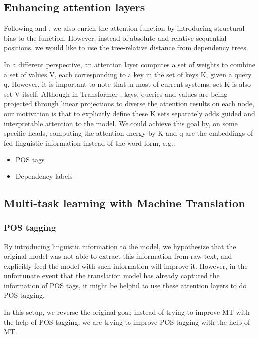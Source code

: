 \documentclass{article}
\begin{document}
\subsection{Enhancing attention layers}

Following \cite{DBLP:conf/naacl/CohnHVYDH16} and \cite{DBLP:conf/naacl/ShawUV18}, we also enrich the attention function by introducing structural bias to the function. However, instead of absolute and relative sequential positions, we would like to use the tree-relative distance from dependency trees.

In a different perspective, an attention layer computes a set of weights to combine a set of values V, each corresponding to a key in the set of keys K, given a query q. However, it is important to note that in most of current systems, set K is also set V itself. Although in Transformer \citep{DBLP:conf/nips/VaswaniSPUJGKP17}, keys, queries and values are being projected through linear projections to diverse the attention results on each node, our motivation is that to explicitly define these K sets separately adds guided and interpretable attention to the model. We could achieve this goal by, on some specific heads, computing the attention energy by K and q are the embeddings of fed linguistic information instead of the word form, e.g.:
\begin{itemize}
    \item POS tags
    \item Dependency labels
\end{itemize}


\subsection{Multi-task learning with Machine Translation}

\subsubsection{POS tagging}

By introducing linguistic information to the model, we hypothesize that the original model was not able to extract this information from raw text, and explicitly feed the model with such information will improve it. However, in the unfortunate event that the translation model has already captured the information of POS tags, it might be helpful to use these attention layers to do POS tagging.

In this setup, we reverse the original goal; instead of trying to improve MT with the help of POS tagging, we are trying to improve POS tagging with the help of MT.
\end{document}
